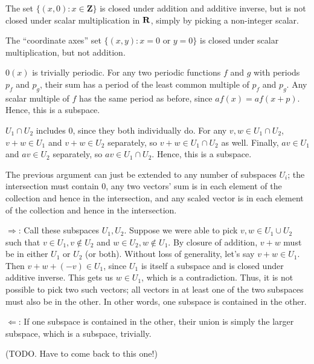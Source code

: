 \documentclass{article}
\begin{document}
The set $\{(x, 0) : x \in \mathbf{Z}\}$ is closed under addition and additive
inverse, but is not closed under scalar multiplication in $\mathbf{R}$, simply by
picking a non-integer scalar.


The ``coordinate axes'' set $\{(x, y) : x = 0 \text{ or } y = 0\}$ is closed
under scalar multiplication, but not addition.


$0(x)$ is trivially periodic. For any two periodic functions $f$ and $g$ with
periods $p_f$ and $p_g$, their sum has a period of the least common multiple of
$p_f$ and $p_g$. Any scalar multiple of $f$ has the same period as before, since
$af(x) = af(x + p)$. Hence, this is a subspace.


$U_1 \cap U_2$ includes 0, since they both individually do. For any $v, w \in
U_1 \cap U_2$, $v + w \in U_1$ and $v + w \in U_2$ separately, so $v + w \in U_1
\cap U_2$ as well. Finally, $av \in U_1$ and $av \in U_2$ separately, so $av \in
U_1 \cap U_2$. Hence, this is a subspace.


The previous argument can just be extended to any number of subspaces $U_i$; the
intersection must contain 0, any two vectors' sum is in each element of the
collection and hence in the intersection, and any scaled vector is in each
element of the collection and hence in the intersection.


$\Rightarrow$: Call these subspaces $U_1, U_2$. Suppose we were able to pick $v,
w \in U_1 \cup U_2$ such that $v \in U_1, v \notin U_2$ and $w \in U_2, w \notin
U_1$. By closure of addition, $v + w$ must be in either $U_1$ or $U_2$ (or
both). Without loss of generality, let's say $v + w \in U_1$. Then $v + w + (-v)
\in U_1$, since $U_1$ is itself a subspace and is closed under additive inverse.
This gets us $w \in U_1$, which is a contradiction. Thus, it is not possible to
pick two such vectors; all vectors in at least one of the two subspaces must
also be in the other. In other words, one subspace is contained in the other.

$\Leftarrow$: If one subspace is contained in the other, their union is simply
the larger subspace, which is a subspace, trivially.


(TODO. Have to come back to this one!)
\end{document}
